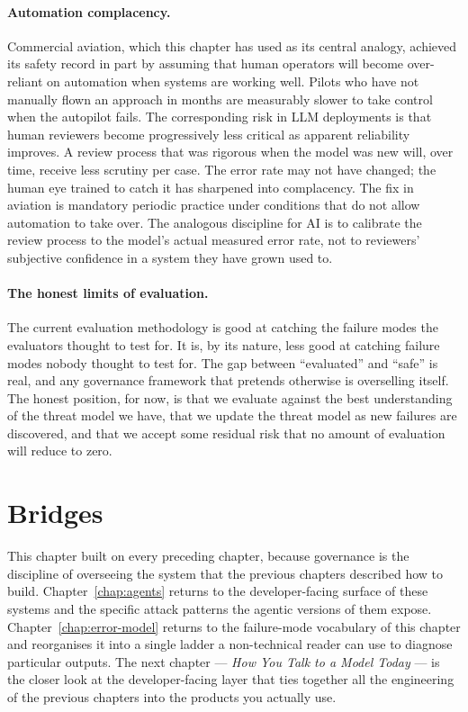 \paragraph{Automation complacency.} Commercial aviation, which
this chapter has used as its central analogy, achieved its
safety record in part by assuming that human operators will
become over-reliant on automation when systems are working
well. Pilots who have not manually flown an approach in months
are measurably slower to take control when the autopilot
fails. The corresponding risk in LLM deployments is that human
reviewers become progressively less critical as apparent
reliability improves. A review process that was rigorous when
the model was new will, over time, receive less scrutiny per
case. The error rate may not have changed; the human eye
trained to catch it has sharpened into complacency. The fix
in aviation is mandatory periodic practice under conditions
that do not allow automation to take over. The analogous
discipline for AI is to calibrate the review process to the
model's actual measured error rate, not to reviewers'
subjective confidence in a system they have grown used to.

\paragraph{The honest limits of evaluation.} The current
evaluation methodology is good at catching the failure modes
the evaluators thought to test for. It is, by its nature, less
good at catching failure modes nobody thought to test for. The
gap between ``evaluated'' and ``safe'' is real, and any
governance framework that pretends otherwise is overselling
itself. The honest position, for now, is that we evaluate
against the best understanding of the threat model we have,
that we update the threat model as new failures are
discovered, and that we accept some residual risk that no
amount of evaluation will reduce to zero.

\section*{Bridges}

This chapter built on every preceding chapter, because
governance is the discipline of overseeing the system that
the previous chapters described how to build. Chapter~\ref{chap:agents}
returns to the developer-facing surface of these systems and
the specific attack patterns the agentic versions of them
expose. Chapter~\ref{chap:error-model} returns to the failure-mode vocabulary of
this chapter and reorganises it into a single ladder a
non-technical reader can use to diagnose particular outputs.
The next chapter --- \emph{How You Talk to a Model Today} ---
is the closer look at the developer-facing layer that ties
together all the engineering of the previous chapters into the
products you actually use.
